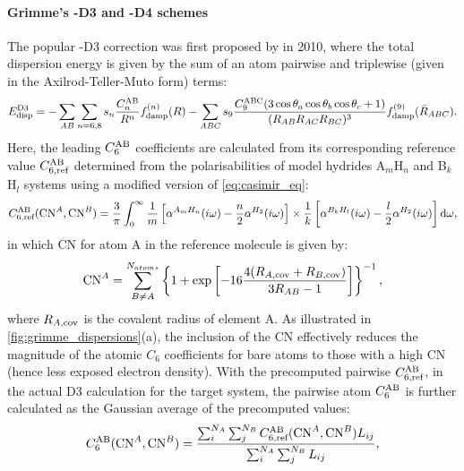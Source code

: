 \paragraph{\textbf{Grimme's -D3 and -D4 schemes}} The popular -D3 correction was first proposed by \citet{grimme2010consistent} in 2010, where the total dispersion energy is given by the sum of an atom pairwise and triplewise (given in the Axilrod-Teller-Muto form\cite{axilrod1943interaction,muto}) terms:
\begin{equation}\label{eqn:D3}
E_{\mbox{\scriptsize{disp}}}^{{\mbox{\scriptsize{D3}}}}=-\sum_{AB}\sum_{n=6,8}s_n \frac{C_n^{\mbox{\scriptsize{AB}}}}{R^n}f_{\mbox{\scriptsize{damp}}}^{(n)}(R)-\sum_{ABC}s_9 \frac{C_{9}^{\mbox{\scriptsize{ABC}}}(3\cos\theta_a \cos\theta_b\cos\theta_c +1)}{(R_{AB}R_{AC}R_{BC})^3}f_{\mbox{\scriptsize{damp}}}^{(9)}(\bar{R}_{ABC}).
\end{equation}
Here, the leading $C_6^{\mbox{\scriptsize{AB}}}$ coefficients are calculated from its corresponding reference value $C_{6,\mbox{\scriptsize{ref}}}^{\mbox{\scriptsize{AB}}}$ determined from the polarisabilities of model hydrides A$_m$H$_n$ and B$_k$H$_l$ systems using a modified version of \cref{eq:casimir_eq}:
\begin{equation}\label{eq:d3-casimir-eq}
C_{6,\mbox{\scriptsize{ref}}}^{\mbox{\scriptsize{AB}}}(\mbox{CN}^A,\mbox{CN}^{B})=\frac{3}{\pi}\int_0^\infty\frac{1}{m}\left[\alpha^{A_m H_n}(i\omega)-\frac{n}{2}\alpha^{H_2}(i\omega)\right]\times\frac{1}{k}\left[\alpha^{B_k H_l}(i\omega)-\frac{l}{2}\alpha^{H_2}(i\omega)\right]\mbox{d}\omega,
\end{equation}
in which CN for atom A in the reference molecule is given by:
\begin{equation}\label{eq:D3_coord_nummer}
\mbox{CN}^A=\sum_{B\neq A}^{N_{atoms}}\left\{1+\exp\left[-16\frac{4(R_{A,\mbox{\scriptsize{cov}}}+R_{B,\mbox{\scriptsize{cov}}})}{3R_{AB}-1}\right]\right\}^{-1},
\end{equation}
where $R_{A,\mbox{\scriptsize{cov}}}$ is the covalent radius of element A. As illustrated in \cref{fig:grimme_dispersions}(a), the inclusion of the CN effectively reduces the magnitude of the atomic $C_6$ coefficients for bare atoms to those with a high CN (hence less exposed electron density). With the precomputed pairwise $C_{6,\mbox{\scriptsize{ref}}}^{\mbox{\scriptsize{AB}}}$, in the actual D3 calculation for the target system, the pairwise atom $C_{6}^{\mbox{\scriptsize{AB}}}$ is further calculated as the Gaussian average of the precomputed values:
\begin{equation}\label{eq:actual_c6_grimme}
C_{6}^{\mbox{\scriptsize{AB}}}(\mbox{CN}^A,\mbox{CN}^{B})=\frac{\sum_i^{N_A}\sum_j^{N_B}C_{6,\mbox{\scriptsize{ref}}}^{\mbox{\scriptsize{AB}}}(\mbox{CN}^A,\mbox{CN}^{B})L_{ij}}{\sum_i^{N_A}\sum_j^{N_B}L_{ij}},
\end{equation}
